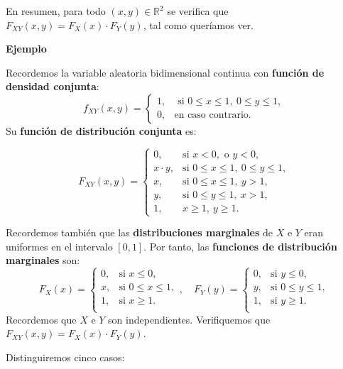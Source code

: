 \documentclass[
  letterpaper,
  DIV=11,
  numbers=noendperiod]{scrreprt}
\begin{document}
En resumen, para todo \((x,y)\in \mathbb{R}^2\) se verifica que
\(F_{XY}(x,y)=F_X(x)\cdot F_Y(y)\), tal como queríamos ver.

\textbf{Ejemplo}

Recordemos la variable aleatoria bidimensional continua con
\textbf{función de densidad conjunta}: \[
f_{XY}(x,y)=\begin{cases}
1, & \mbox{ si }0\leq x\leq 1,\ 0\leq y\leq 1, \\
0, & \mbox{en caso contrario.}
\end{cases}
\] Su \textbf{función de distribución conjunta} es:

\[
F_{XY}(x,y)=\begin{cases}
0, & \mbox{si }x<0,\mbox{ o }y<0,\\
x\cdot y, & \mbox{si }0\leq x\leq 1,\ 0\leq y\leq 1, \\
x, & \mbox{si }0\leq x\leq 1,\ y> 1, \\
y, & \mbox{si }0\leq y\leq 1,\ x> 1, \\
1, & x\geq 1,\ y\geq 1.
\end{cases}
\]

Recordemos también que las \textbf{distribuciones marginales} de \(X\) e
\(Y\) eran uniformes en el intervalo \([0,1]\). Por tanto, las
\textbf{funciones de distribución marginales} son: \[
F_X(x)=\begin{cases}
0, & \mbox{si }x\leq 0, \\
x, & \mbox{si }0\leq x\leq 1, \\
1, & \mbox{si }x\geq 1. \\
\end{cases},\quad 
F_Y(y)=\begin{cases}
0, & \mbox{si }y\leq 0, \\
y, & \mbox{si }0\leq y\leq 1, \\
1, & \mbox{si }y\geq 1. \\
\end{cases}
\] Recordemos que \(X\) e \(Y\) son independientes. Verifiquemos que
\(F_{XY}(x,y)=F_X(x)\cdot F_Y(y)\).

Distinguiremos cinco casos:
\end{document}
